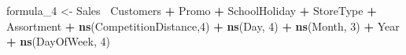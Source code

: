 \documentclass[]{article}
\newenvironment{Shaded}{\begin{snugshade}}{\end{snugshade}}
\newcommand{\DecValTok}[1]{\textcolor[rgb]{0.00,0.00,0.81}{#1}}
\newcommand{\KeywordTok}[1]{\textcolor[rgb]{0.13,0.29,0.53}{\textbf{#1}}}
\newcommand{\NormalTok}[1]{#1}
\newcommand{\OperatorTok}[1]{\textcolor[rgb]{0.81,0.36,0.00}{\textbf{#1}}}
\newcommand{\StringTok}[1]{\textcolor[rgb]{0.31,0.60,0.02}{#1}}
\begin{document}
\begin{Shaded}
\begin{Highlighting}[]
\NormalTok{formula_}\DecValTok{4}\NormalTok{ <-}\StringTok{ }\NormalTok{Sales}\OperatorTok{~}\StringTok{ }\NormalTok{Customers }\OperatorTok{+}\StringTok{ }\NormalTok{Promo }\OperatorTok{+}\StringTok{ }\NormalTok{SchoolHoliday }\OperatorTok{+}\StringTok{ }\NormalTok{StoreType }\OperatorTok{+}\StringTok{ }\NormalTok{Assortment }\OperatorTok{+}\StringTok{ }\KeywordTok{ns}\NormalTok{(CompetitionDistance,}\DecValTok{4}\NormalTok{) }\OperatorTok{+}\StringTok{ }\KeywordTok{ns}\NormalTok{(Day, }\DecValTok{4}\NormalTok{) }\OperatorTok{+}\StringTok{ }\KeywordTok{ns}\NormalTok{(Month, }\DecValTok{3}\NormalTok{) }\OperatorTok{+}\StringTok{ }\NormalTok{Year }\OperatorTok{+}\StringTok{ }\KeywordTok{ns}\NormalTok{(DayOfWeek, }\DecValTok{4}\NormalTok{)}
\end{Highlighting}
\end{Shaded}
\end{document}
